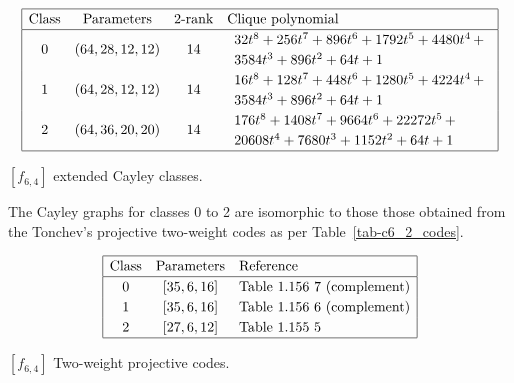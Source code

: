\documentclass[12pt,a4paper]{article}
\begin{document}
\begin{table}[!bhpt] %
%
\small{}
\begin{align*}
\def\arraystretch{1.2}
\begin{array}{|cccl|}
\hline
\text{Class} &
\text{Parameters} &
\text{2-rank} &
\text{Clique polynomial}
\\
\hline
0 &
(64, 28, 12, 12) &
14 &
\begin{array}{l}
32t^{8} + 256t^{7} + 896t^{6} + 1792t^{5} + 4480t^{4}
\,+
\\
 3584t^{3} + 896t^{2} + 64t + 1
\end{array}
\\
1 &
(64, 28, 12, 12) &
14 &
\begin{array}{l}
16t^{8} + 128t^{7} + 448t^{6} + 1280t^{5} + 4224t^{4}
\,+
\\
 3584t^{3} + 896t^{2} + 64t + 1
\end{array}
\\
2 &
(64, 36, 20, 20) &
14 &
\begin{array}{l}
176t^{8} + 1408t^{7} + 9664t^{6} + 22272t^{5}
\,+
\\
 20608t^{4} + 7680t^{3} + 1152t^{2} + 64t + 1
\end{array}
\\
\hline
\end{array}
\end{align*}
\caption{$[f_{6,4}]$ extended Cayley classes.}
\label{tab-c6_4_EC_classes}
\end{table}

The Cayley graphs for classes 0 to 2 are isomorphic to those those obtained from the
Tonchev's projective two-weight codes \cite{Ton07codes} as per Table~\ref{tab-c6_2_codes}.

\begin{table}[!bhpt] %
\small{
\begin{align*}
\def\arraystretch{1.2}
\begin{array}{|ccl|}
\hline
\text{Class} &
\text{Parameters} & \text{Reference}
\\
\hline
0 & [35,6,16] & \text{Table 1.156 7 (complement)}
\\
1 & [35,6,16] & \text{Table 1.156 6 (complement)}
\\
2 & [27,6,12] & \text{Table 1.155 5 }
\\
\hline
\end{array}
\end{align*}
}
\caption{$[f_{6,4}]$ Two-weight projective codes.}
\label{tab-c6_4_codes}
\end{table}
\end{document}
